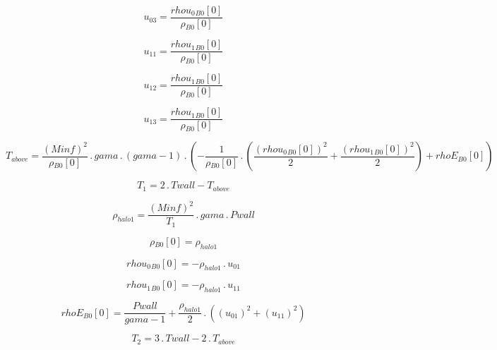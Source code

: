 \documentclass{article}
\begin{document}
\begin{dmath}u_{03} = \frac{{rhou_{0}{_{B0}}}[{0}]}{{\rho{_{B0}}}[{0}]}\end{dmath}

\begin{dmath}u_{11} = \frac{{rhou_{1}{_{B0}}}[{0}]}{{\rho{_{B0}}}[{0}]}\end{dmath}

\begin{dmath}u_{12} = \frac{{rhou_{1}{_{B0}}}[{0}]}{{\rho{_{B0}}}[{0}]}\end{dmath}

\begin{dmath}u_{13} = \frac{{rhou_{1}{_{B0}}}[{0}]}{{\rho{_{B0}}}[{0}]}\end{dmath}

\begin{dmath}T_{above} = \frac{\left(Minf \right)^{2}}{{\rho{_{B0}}}[{0}]} \,.\, gama \,.\, \left(gama - 1\right) \,.\, \left(- \frac{1}{{\rho{_{B0}}}[{0}]} \,.\, \left(\frac{\left({rhou_{0}{_{B0}}}[{0}] \right)^{2}}{2} + 
\frac{\left({rhou_{1}{_{B0}}}[{0}] \right)^{2}}{2}\right) + {rhoE{_{B0}}}[{0}]\right)\end{dmath}

\begin{dmath}T_{1} = 2 \,.\, Twall - T_{above}\end{dmath}

\begin{dmath}\rho_{halo 1} = \frac{\left(Minf \right)^{2}}{T_{1}} \,.\, gama \,.\, Pwall\end{dmath}

\begin{dmath}{\rho{_{B0}}}[{0}] = \rho_{halo 1}\end{dmath}

\begin{dmath}{rhou_{0}{_{B0}}}[{0}] = - \rho_{halo 1} \,.\, u_{01}\end{dmath}

\begin{dmath}{rhou_{1}{_{B0}}}[{0}] = - \rho_{halo 1} \,.\, u_{11}\end{dmath}

\begin{dmath}{rhoE{_{B0}}}[{0}] = \frac{Pwall}{gama - 1} + \frac{\rho_{halo 1}}{2} \,.\, \left(\left(u_{01} \right)^{2} + \left(u_{11} \right)^{2}\right)\end{dmath}

\begin{dmath}T_{2} = 3 \,.\, Twall - 2 \,.\, T_{above}\end{dmath}
\end{document}
